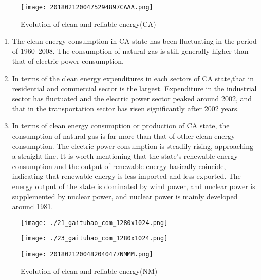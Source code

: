 \documentclass[a4paper]{article}
\begin{document}
\begin{figure}[H]
	\begin{center}
		\texttt{[image: 2018021200475294897CAAA.png]}
		\caption{Evolution of clean and reliable energy(CA)}
		\label{Fig:1}
	\end{center}
	\vspace{-0.5em}
\end{figure}


\begin{enumerate}
\item The clean energy consumption in CA state has been fluctuating in the period of 1960~2008. The consumption of natural gas is still generally higher than that of electric power consumption.

\item In terms of the clean energy expenditures in each sectors of CA state,that in residential and commercial sector is the largest. Expenditure in the industrial sector has fluctuated and the electric power sector peaked around 2002, and that in the transportation sector has risen significantly after 2002 years.

\item In terms of clean energy consumption or production of CA state, the consumption of natural gas is far more than that of other clean energy consumption. The electric power consumption is steadily rising, approaching a straight line. It is worth mentioning that the state's renewable energy consumption and the output of renewable energy basically coincide, indicating that renewable energy is less imported and less exported. The energy output of the state is dominated by wind power, and nuclear power is supplemented by nuclear power, and nuclear power is mainly developed around 1981.
\end{enumerate}


\begin{figure}[H]
\begin{minipage}[t]{0.5\linewidth}
\centering
\texttt{[image: ./21\_gaitubao\_com\_1280x1024.png]}
\label{fig:side:a}
\end{minipage}%
\begin{minipage}[t]{0.5\linewidth}
\centering
\texttt{[image: ./23\_gaitubao\_com\_1280x1024.png]}
\label{fig:side:b}
\end{minipage}
\end{figure}

\begin{figure}[H]
	\begin{center}
		\texttt{[image: 2018021200482040477NMMM.png]}
		\caption{Evolution of clean and reliable energy(NM)}
		\label{Fig:1}
	\end{center}
	\vspace{-0.5em}
\end{figure}
\end{document}
